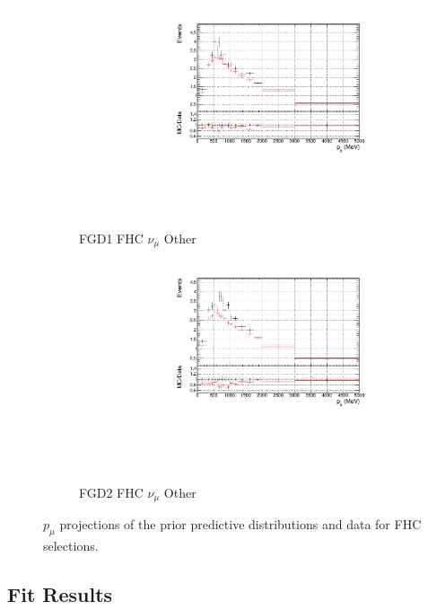 \begin{figure}[!htbp]
\begin{subfigure}{0.49\textwidth}
  \centering
  \includegraphics[width=\textwidth]{figs/prioronly1D_p_FGD1_numuCC_other}
  \caption{FGD1 FHC $\nu_{\mu}$ Other}
\end{subfigure}
\begin{subfigure}{0.49\textwidth}
  \centering
  \includegraphics[width=\textwidth]{figs/prioronly1D_p_FGD2_numuCC_other}
  \caption{FGD2 FHC $\nu_{\mu}$ Other}
  \label{fig:priorpost_FGD2_numuCC_other}
\end{subfigure}
\caption{$p_{\mu}$ projections of the prior predictive distributions and data for FHC \numu selections.}
\label{fig:priorpost_fhc_p}
\end{figure}

\subsection{Fit Results}


